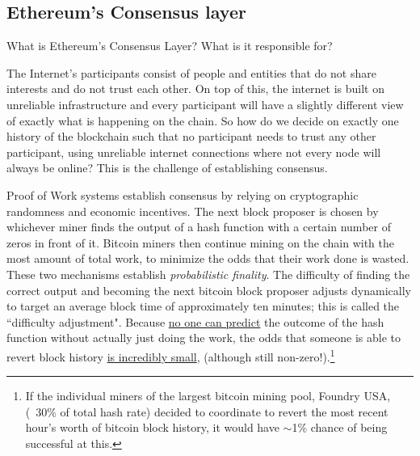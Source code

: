 \documentclass[12pt]{article}
\begin{document}
\subsection[\protect\textbf{\small Ethereum's Consensus Layer}]{Ethereum's Consensus layer}

What is Ethereum's Consensus Layer? What is it responsible for?

The Internet's participants consist of people and entities that do not share interests and do not trust each other. On top of this, the internet is built on unreliable infrastructure and every participant will have a slightly different view of exactly what is happening on the chain. So how do we decide on exactly one history of the blockchain such that no participant needs to trust any other participant, using unreliable internet connections where not every node will always be online? This is the challenge of establishing consensus. 

Proof of Work systems establish consensus by relying on cryptographic randomness and economic incentives. The next block proposer is chosen by whichever miner finds the output of a hash function with a certain number of zeros in front of it. Bitcoin miners then continue mining on the chain with the most amount of total work, to minimize the odds that their work done is wasted. These two mechanisms establish \textit{probabilistic finality}. The difficulty of finding the correct output and becoming the next bitcoin block proposer adjusts dynamically to target an average block time of approximately ten minutes; this is called the ``difficulty adjustment". Because \href{https://www.youtube.com/watch?v=orIgy2MjqrA&t=214s}{no one can predict} the outcome of the hash function without actually just doing the work, the odds that someone is able to revert block history \href{https://www.youtube.com/watch?v=S9JGmA5_unY}{is incredibly small}, (although still non-zero!).\footnote{If the individual miners of the largest bitcoin mining pool, Foundry USA, (~30\% of total hash rate) decided to coordinate to revert the most recent hour's worth of bitcoin block history, it would have $\sim$1\% chance of being successful at this. } 
\end{document}
